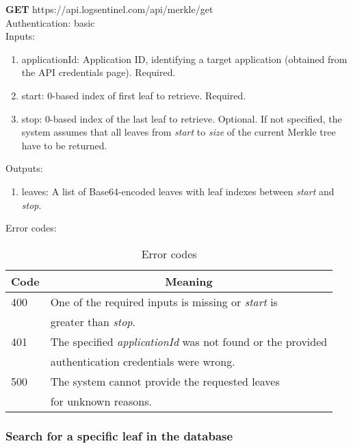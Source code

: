 \documentclass{article}
\begin{document}
		\textbf{GET} https://api.logsentinel.com/api/merkle/get \\
		
		\noindent Authentication: basic \\
		
		\noindent Inputs:
		\begin{enumerate}
			\item applicationId: Application ID, identifying a target application (obtained from the API credentials page). Required.
			\item start: 0-based index of first leaf to retrieve. Required.
			\item stop: 0-based index of the last leaf to retrieve. Optional. If not specified, the system assumes that all leaves from \textit{start} to \textit{size} of the current Merkle tree have to be returned. 
		\end{enumerate}
		
		\noindent Outputs:
		\begin{enumerate}
			\item leaves: A list of Base64-encoded leaves with leaf indexes between \textit{start} and \textit{stop}.
		\end{enumerate}
		
		\noindent Error codes:
		\begin{table}[H]
			\centering
			\caption{Error codes}
			\label{merkle-get-error-codes}
			\begin{tabular}{|l|l|}
				\hline
				\multicolumn{1}{|c|}{Code} & 	\multicolumn{1}{c|}{Meaning} \\ \hline
				400 & One of the required inputs is missing or \textit{start} is \\
				& greater than \textit{stop}. \\ \hline
				401 & The specified \textit{applicationId} was not found or the provided \\
				& authentication credentials were wrong. \\ \hline
				500 & The system cannot provide the requested leaves \\ & for unknown  reasons. \\ \hline
			\end{tabular}
		\end{table}
	
		\subsubsection{Search for a specific leaf in the database}
		
\end{document}
